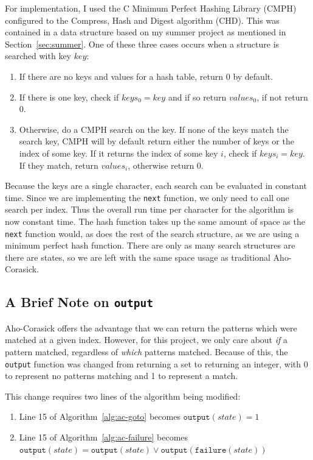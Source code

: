 \documentclass[ %
                    author={Dominic Joseph Moylett},
                    degree={MEng},
                     title={Dictionary Matching with Fingerprints},
                  subtitle={An Empirical Analysis},
                      type={research},
                      year={2015} ]{dissertation}
\begin{document}
For implementation, I used the C Minimum Perfect Hashing Library (CMPH) configured to the Compress, Hash and Digest algorithm (CHD). This was contained in a data structure based on my summer project as mentioned in Section~\ref{sec:summer}. One of these three cases occurs when a structure is searched with key $key$:

\begin{enumerate}
  \item If there are no keys and values for a hash table, return 0 by default.
  \item If there is one key, check if $keys_0 = key$ and if so return $values_0$, if not return 0.
  \item Otherwise, do a CMPH search on the key. If none of the keys match the search key, CMPH will by default return either the number of keys or the index of some key. If it returns the index of some key $i$, check if $keys_i = key$. If they match, return $values_i$, otherwise return 0.
\end{enumerate}

Because the keys are a single character, each search can be evaluated in constant time. Since we are implementing the \texttt{next} function, we only need to call one search per index. Thus the overall run time per character for the algorithm is now constant time. The hash function takes up the same amount of space as the \texttt{next} function would, as does the rest of the search structure, as we are using a minimum perfect hash function. There are only as many search structures are there are states, so we are left with the same space usage as traditional Aho-Corasick.

\subsection{A Brief Note on \texttt{output}}

Aho-Corasick offers the advantage that we can return the patterns which were matched at a given index. However, for this project, we only care about \textit{if} a pattern matched, regardless of \textit{which} patterns matched. Because of this, the \texttt{output} function was changed from returning a set to returning an integer, with 0 to represent no patterns matching and 1 to represent a match.

This change requires two lines of the algorithm being modified:

\begin{enumerate}
  \item Line 15 of Algorithm~\ref{alg:ac-goto} becomes $\texttt{output}(state) = 1$
  \item Line 15 of Algorithm~\ref{alg:ac-failure} becomes $\texttt{output}(state) = \texttt{output}(state) \vee \texttt{output}(\texttt{failure}(state))$
\end{enumerate}
\end{document}
